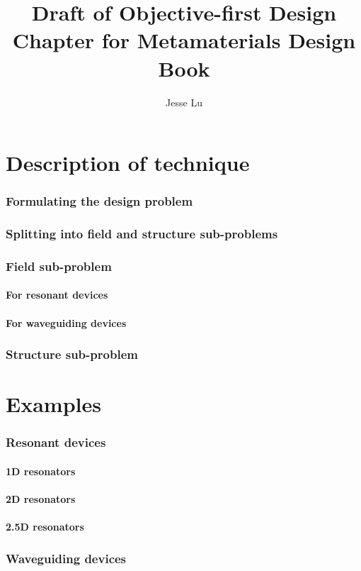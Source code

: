 \documentclass{article}
\title{Draft of Objective-first Design Chapter for Metamaterials Design Book}
\author{Jesse Lu}
\begin{document}
\maketitle
\tableofcontents
\part{Description of technique}
\section{Formulating the design problem}
\section{Splitting into field and structure sub-problems}
\section{Field sub-problem}
\subsection{For resonant devices}
\subsection{For waveguiding devices}

\section{Structure sub-problem}


\part{Examples}
\section{Resonant devices}
\subsection{1D resonators}
\subsection{2D resonators}
\subsection{2.5D resonators}
\section{Waveguiding devices}
\end{document}
